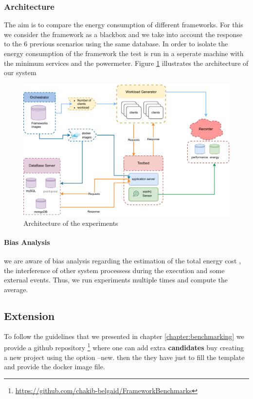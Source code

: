 \subsubsection{Architecture}
The aim is to compare the energy consumption of different frameworks. For this we consider the framework as a blackbox and we take into account the response to the 6 previous scenarios using the same database.
In order to isolate the energy consumption of the framework the test is run in a seperate machine with the minimum services and the powermeter.
Figure \ref{fig:architecture} illustrates the architecture of our system

\begin{figure}[bht]
    \centering
    \includegraphics[width=.8\columnwidth]{imgs/architecture}
    \caption[Architecture]{Architecture of the experiments}
    \label{fig:architecture}
\end{figure}


\paragraph{Bias Analysis}
we are aware of bias analysis regarding the estimation of the total energy cost , the interference of other system processess during the execution and some external events. Thus, we run experiments multiple times and compute the average.

\subsection{Extension}
To follow the guidelines that we presented in chapter \ref{chapter:benchmarking} we provide a github repository \footnote{\url{https://github.com/chakib-belgaid/FrameworkBenchmarks}} where one can add extra \textbf{candidates} buy creating a new project using the option --new. then the they have just to fill the template and provide the docker image file.

